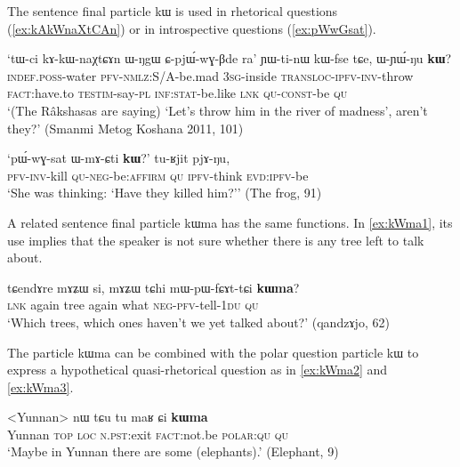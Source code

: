 \documentclass[oldfontcommands,oneside,a4paper,11pt]{article}
\newcommand{\ipa}[1]{{\phon #1}} %
\begin{document}
 
The sentence final particle \ipa{kɯ} is used in rhetorical questions (\ref{ex:kAkWnaXtCAn}) or in introspective questions (\ref{ex:pWwGsat}).
 \begin{exe} 
 \ex \label{ex:kAkWnaXtCAn}
\gll 
`\ipa{tɯ-ci} 	\ipa{kɤ-kɯ-naχtɕɤn} 	\ipa{ɯ-ŋgɯ} 	\ipa{ɕ-pjɯ́-wɣ-βde} 	\ipa{ra}' 	\ipa{ɲɯ-ti-nɯ} 	\ipa{kɯ-fse} 	\ipa{tɕe,} 	\ipa{ɯ-ɲɯ́-ŋu} 	\ipa{\textbf{kɯ}?} \\
\textsc{indef.poss}-water \textsc{pfv-nmlz}:S/A-be.mad \textsc{3sg}-inside \textsc{transloc-ipfv-inv}-throw \textsc{fact}:have.to \textsc{testim}-say-\textsc{pl} \textsc{inf:stat}-be.like \textsc{lnk} \textsc{qu-const}-be \textsc{qu} \\
\glt `(The Râkshasas are saying)  `Let's throw him in the river of madness', aren't they?' (Smanmi Metog Koshana 2011, 101)
\end{exe} 
 
  \begin{exe} 
 \ex \label{ex:pWwGsat}
\gll 
`\ipa{pɯ́-wɣ-sat} 	\ipa{ɯ-mɤ-ɕti} 	\ipa{\textbf{kɯ}?}' 	\ipa{tu-ʁjit} 	\ipa{pjɤ-ŋu,} \\
\textsc{pfv-inv}-kill \textsc{qu-neg}-be:\textsc{affirm} \textsc{qu} \textsc{ipfv}-think \textsc{evd:ipfv}-be \\
\glt `She was thinking: `Have they killed him?'' (The frog, 91)
 \end{exe}  
 
 A related sentence final particle \ipa{kɯma} has the same functions. In  \ref{ex:kWma1}, its use implies that   the speaker is not sure whether there is any tree left to talk about.
   \begin{exe} 
 \ex \label{ex:kWma1}
\gll 
 \ipa{tɕendɤre} 	\ipa{mɤʑɯ} 	\ipa{si,} 	\ipa{mɤʑɯ} 	\ipa{tɕhi} 	\ipa{mɯ-pɯ-fɕɤt-tɕi} 	\ipa{\textbf{kɯma}?} \\
\textsc{lnk} again tree again what \textsc{neg-pfv}-tell-\textsc{1du} \textsc{qu} \\
\glt `Which trees, which ones haven't we yet talked about?'  (qandzɤjo, 62)
  \end{exe} 
  
  The particle \ipa{kɯma} can be combined with the polar question particle \ipa{kɯ} to express a hypothetical quasi-rhetorical question as in \ref{ex:kWma2} and \ref{ex:kWma3}.
     \begin{exe} 
 \ex \label{ex:kWma2}
\gll 
 <Yunnan> \ipa{nɯ} 	\ipa{tɕu} 	\ipa{tu} 	\ipa{maʁ} 	\ipa{ɕi} 	\ipa{\textbf{kɯma}} \\
 Yunnan \textsc{top} \textsc{loc} \textsc{n.pst:}exit \textsc{fact}:not.be \textsc{polar:qu} \textsc{qu} \\
\glt  `Maybe in Yunnan there are some (elephants).' (Elephant, 9)
   \end{exe}
   
\end{document}
